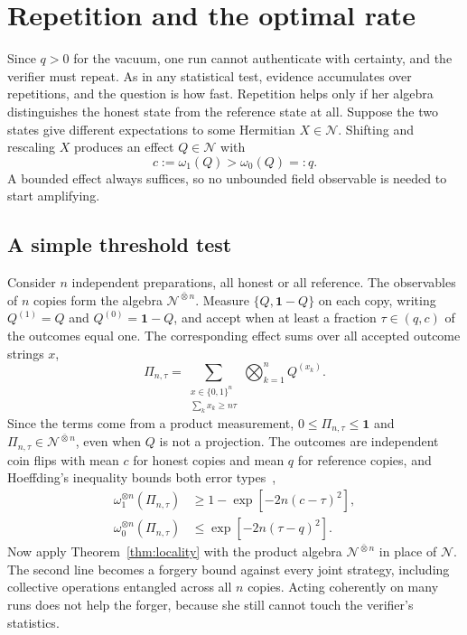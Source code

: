 \documentclass[11pt,a4paper]{article}
\newcommand{\N}{\mathcal{N}}
\begin{document}
\section{Repetition and the optimal rate}
\label{sec:amplification}

Since $q>0$ for the vacuum, one run cannot authenticate with certainty, and the verifier must repeat. As in any statistical test, evidence accumulates over repetitions, and the question is how fast. Repetition helps only if her algebra distinguishes the honest state from the reference state at all. Suppose the two states give different expectations to some Hermitian $X\in\N$. Shifting and rescaling $X$ produces an effect $Q\in\N$ with
\begin{equation}
c:=\omega_1(Q)>\omega_0(Q)=:q.
\label{eq:gap}
\end{equation}
A bounded effect always suffices, so no unbounded field observable is needed to start amplifying.

\subsection{A simple threshold test}

Consider $n$ independent preparations, all honest or all reference. The observables of $n$ copies form the algebra $\N^{\bar\otimes n}$. Measure $\{Q,\mathbf{1}-Q\}$ on each copy, writing $Q^{(1)}=Q$ and $Q^{(0)}=\mathbf{1}-Q$, and accept when at least a fraction $\tau\in(q,c)$ of the outcomes equal one. The corresponding effect sums over all accepted outcome strings $x$,
\begin{equation}
\Pi_{n,\tau}
=
\sum_{\substack{x\in\{0,1\}^n\\ \sum_kx_k\ge n\tau}}
\bigotimes_{k=1}^{n}Q^{(x_k)}.
\label{eq:threshold-effect}
\end{equation}
Since the terms come from a product measurement, $0\le\Pi_{n,\tau}\le\mathbf{1}$ and $\Pi_{n,\tau}\in\N^{\bar\otimes n}$, even when $Q$ is not a projection. The outcomes are independent coin flips with mean $c$ for honest copies and mean $q$ for reference copies, and Hoeffding's inequality bounds both error types~\cite{hoeffding1963probability},
\begin{align}
\omega_1^{\otimes n}(\Pi_{n,\tau})
&\ge1-\exp[-2n(c-\tau)^2],
\label{eq:complete-hoeffding}\\
\omega_0^{\otimes n}(\Pi_{n,\tau})
&\le\exp[-2n(\tau-q)^2].
\label{eq:sound-hoeffding}
\end{align}
Now apply Theorem~\ref{thm:locality} with the product algebra $\N^{\bar\otimes n}$ in place of $\N$. The second line becomes a forgery bound against every joint strategy, including collective operations entangled across all $n$ copies. Acting coherently on many runs does not help the forger, because she still cannot touch the verifier's statistics.
\end{document}
